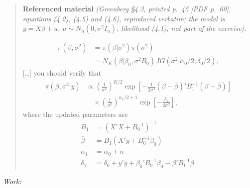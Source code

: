\documentclass[11pt,a4paper]{article}
\newif\ifsolucoes
\newcommand{\espacoresol}{4.5cm}   %
\newenvironment{contexto}[1]{\begin{quote}\small\noindent\textbf{Referenced material} \textit{(#1; not part of the exercise).}\par}{\end{quote}}
\newcommand{\resolespaco}{\ifsolucoes\else\par\textit{Work:}\vspace{\espacoresol}\par\fi}
\begin{document}
\begin{contexto}{Greenberg \S4.3, printed p.~45 [PDF p.~60], equations (4.2), (4.5) and (4.6), reproduced verbatim; the model is $y=X\beta+u$, $u\sim N_n(0,\sigma^2I_n)$, likelihood (4.1)}
\begin{align*}
\pi(\beta,\sigma^2)&=\pi(\beta|\sigma^2)\pi(\sigma^2) \tag{4.2}\\
&=N_K(\beta|\beta_0,\sigma^2B_0)\,IG(\sigma^2|\alpha_0/2,\delta_0/2),
\end{align*}
[\ldots] you should verify that
\begin{align*}
\pi(\beta,\sigma^2|y)&\propto\left(\frac{1}{\sigma^2}\right)^{K/2}\exp\left[-\frac{1}{2\sigma^2}(\beta-\bar\beta)'B_1^{-1}(\beta-\bar\beta)\right]\\
&\quad\times\left(\frac{1}{\sigma^2}\right)^{\alpha_1/2+1}\exp\left[-\frac{\delta_1}{2\sigma^2}\right], \tag{4.5}
\end{align*}
where the updated parameters are
\begin{align*}
B_1&=(X'X+B_0^{-1})^{-1} \tag{4.6}\\
\bar\beta&=B_1(X'y+B_0^{-1}\beta_0)\\
\alpha_1&=\alpha_0+n\\
\delta_1&=\delta_0+y'y+\beta_0'B_0^{-1}\beta_0-\bar\beta'B_1^{-1}\bar\beta.
\end{align*}
\end{contexto}
\resolespaco
\end{document}
